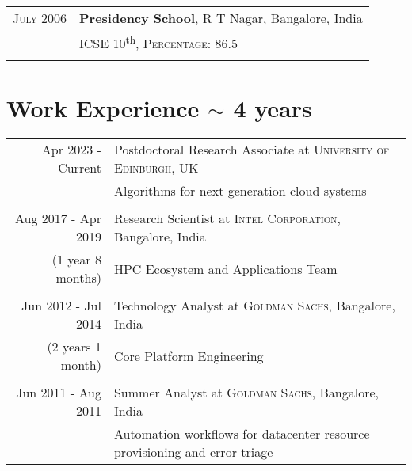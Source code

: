 \documentclass[a4paper,10pt]{article} %
\begin{document}
\begin{tabular}{rl}

\textsc{July} 2006 & \textbf{Presidency School}, R T Nagar, Bangalore, India\\
& \textsc{ICSE 10}\textsuperscript{th}, \normalsize \textsc{Percentage}: 86.5 \\
\fi

\end{tabular}


\section{Work Experience $\sim$ 4 years}

\begin{tabular}{r|p{10cm}}
Apr 2023 - Current & Postdoctoral Research Associate at \textsc{University of Edinburgh}, UK \\
& \footnotesize{Algorithms for next generation cloud systems}\\
&\\
Aug 2017 - Apr 2019 & Research Scientist at \textsc{Intel Corporation}, Bangalore, India \\
{\footnotesize(1 year 8 months)} & \footnotesize{HPC Ecosystem and Applications Team}\\
&\\

Jun 2012 - Jul 2014 & Technology Analyst at \textsc{Goldman Sachs}, Bangalore, India \\
{\footnotesize (2 years 1 month)} & \footnotesize{Core Platform Engineering}\\ 
& \\



Jun 2011 - Aug 2011 & Summer Analyst at \textsc{Goldman Sachs}, Bangalore, India \\
& \footnotesize{Automation workflows for datacenter resource provisioning and error triage}\\



\end{tabular}
\end{document}
